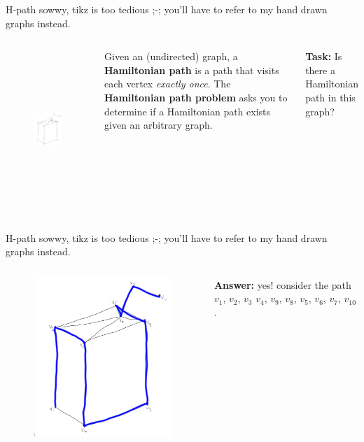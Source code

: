 \documentclass{beamer}
\begin{document}
\begin{frame}{H-path}
{\tiny sowwy, tikz is too tedious ;-; you'll have to refer to my hand drawn graphs instead.}

\begin{columns}
\begin{figure}[h]
\centering
\includegraphics[height=6cm]{img/graph_juice.png}
\end{figure}

Given an (undirected) graph, a \textbf{Hamiltonian path} is a path that visits each vertex \textit{exactly once}. The \textbf{Hamiltonian path problem} asks you to determine if a Hamiltonian path exists given an arbitrary graph.


\vspace{4mm}

\textbf{Task:} Is there a Hamiltonian path in this graph?
\end{columns}




\end{frame}

\begin{frame}{H-path}
{\tiny sowwy, tikz is too tedious ;-; you'll have to refer to my hand drawn graphs instead.}

\begin{columns}
\begin{figure}[h]
\centering
\includegraphics[height=6cm]{img/graph_juice_path.png}
\end{figure}

\textbf{Answer:} yes! consider the path\\ $v_1$, $v_2$, $v_3$ $v_4$, $v_9$, $v_8$, $v_5$, $v_6$, $v_7$, $v_{10}$.
\end{columns}
\end{frame}
\end{document}
